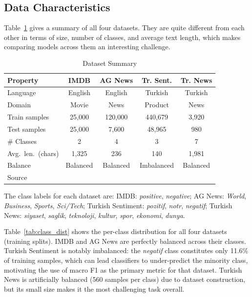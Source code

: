 \documentclass[conference]{IEEEtran}
\begin{document}
\subsection{Data Characteristics}

Table~\ref{tab:dataset_summary} gives a summary of all four datasets. They are quite
different from each other in terms of size, number of classes, and average text length,
which makes comparing models across them an interesting challenge.

\begin{table}[htbp]
	\caption{Dataset Summary}
	\label{tab:dataset_summary}
	\begin{center}
		\footnotesize
		\renewcommand{\arraystretch}{1.2}
		\setlength{\tabcolsep}{5pt}
		\begin{tabular}{lcccc}
			\toprule
			\rowcolor{headerblue}
			\color{white}\textbf{Property} & \color{white}\textbf{IMDB} & \color{white}\textbf{AG News} & \color{white}\textbf{Tr. Sent.} & \color{white}\textbf{Tr. News} \\
			\midrule
			Language      & English   & English   & Turkish   & Turkish \\
			Domain        & Movie     & News      & Product   & News \\
			Train samples & 25,000    & 120,000   & 440,679   & 3,920 \\
			Test samples  & 25,000    & 7,600     & 48,965    & 980 \\
			\# Classes    & 2         & 4         & 3         & 7 \\
			Avg.\ len.\ (chars) & 1,325 & 236     & 140       & 1,981 \\
			Balance       & Balanced  & Balanced  & Imbalanced & Balanced \\
			Source        & \cite{b_imdb} & \cite{b_agnews} & \cite{b_trsentiment} & \cite{b_trnews} \\
			\bottomrule
		\end{tabular}
	\end{center}
\end{table}

The class labels for each dataset are: IMDB: \textit{positive}, \textit{negative};
AG News: \textit{World}, \textit{Business}, \textit{Sports}, \textit{Sci/Tech};
Turkish Sentiment: \textit{pozitif}, \textit{notr}, \textit{negatif};
Turkish News: \textit{siyaset}, \textit{saglik}, \textit{teknoloji}, \textit{kultur},
\textit{spor}, \textit{ekonomi}, \textit{dunya}.

Table~\ref{tab:class_dist} shows the per-class distribution for all four datasets (training
splits). IMDB and AG News are perfectly balanced across their classes. Turkish Sentiment is
notably imbalanced: the \textit{negatif} class constitutes only 11.6\% of training samples,
which can lead classifiers to under-predict the minority class, motivating the use of
macro F1 as the primary metric for that dataset. Turkish News is artificially balanced
(560 samples per class) due to dataset construction, but its small size makes it the most
challenging task overall.
\end{document}

